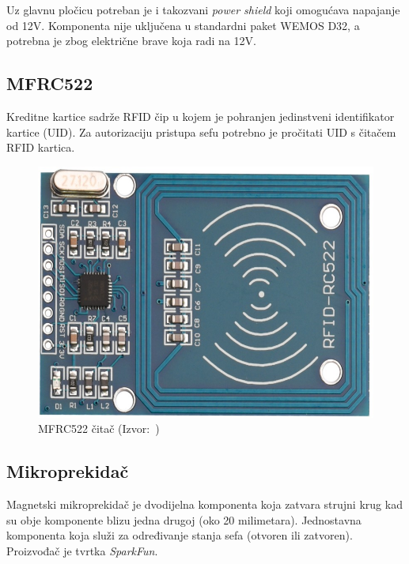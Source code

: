 Uz glavnu pločicu potreban je i takozvani \textit{power shield} koji omogućava napajanje od 12V\@.
Komponenta nije uključena u standardni paket WEMOS D32, a potrebna je zbog električne brave koja radi na 12V\@.

\subsection{MFRC522}

Kreditne kartice sadrže RFID čip u kojem je pohranjen jedinstveni identifikator kartice (UID).
Za autorizaciju pristupa sefu potrebno je pročitati UID s čitačem RFID kartica.

\begin{figure}[h!]
    \centering
    \includegraphics[scale=0.25]{images/mfrc522}
    \caption{MFRC522 čitač (Izvor:~\cite{mfrc522-eradionica})}
\end{figure}

\subsection{Mikroprekidač}

Magnetski mikroprekidač je dvodijelna komponenta koja zatvara strujni krug kad su obje komponente blizu jedna drugoj
(oko 20 milimetara).
Jednostavna komponenta koja služi za određivanje stanja sefa (otvoren ili zatvoren).
Proizvođač je tvrtka \textit{SparkFun}.

